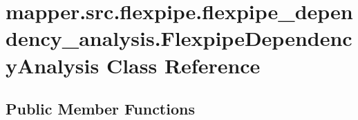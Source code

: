\hypertarget{classmapper_1_1src_1_1flexpipe_1_1flexpipe__dependency__analysis_1_1_flexpipe_dependency_analysis}{}\section{mapper.\+src.\+flexpipe.\+flexpipe\+\_\+dependency\+\_\+analysis.\+Flexpipe\+Dependency\+Analysis Class Reference}
\label{classmapper_1_1src_1_1flexpipe_1_1flexpipe__dependency__analysis_1_1_flexpipe_dependency_analysis}
\subsection*{Public Member Functions}
